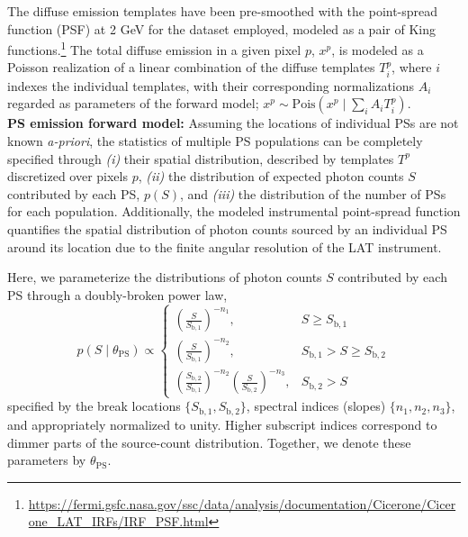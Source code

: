 \documentclass[prd,aps,10pt,nofootinbib,twocolumn,superscriptaddress,preprintnumbers,balancelastpage,longbibliography,floatfix]{revtex4-2}
\begin{document}
The diffuse emission templates have been pre-smoothed with the \Fermi point-spread function (PSF) at 2 GeV for the dataset employed, modeled as a pair of King functions.\footnote{\url{https://fermi.gsfc.nasa.gov/ssc/data/analysis/documentation/Cicerone/Cicerone_LAT_IRFs/IRF_PSF.html}} The total diffuse emission in a given pixel $p$, $x^p$, is modeled as a Poisson realization of a linear combination of the diffuse templates $T^p_i$, where $i$ indexes the individual templates, with their corresponding normalizations $A_i$ regarded as parameters of the forward model; $x^p \sim \mathrm{Pois}\left(x^p\mid\sum_i A_i T^p_i\right)$. \\ 

\noindent
\textbf{PS emission forward model:} Assuming the locations of individual PSs are not known \emph{a-priori}, the statistics of multiple PS populations can be completely specified through \emph{(i)} their spatial distribution, described by templates $T^p$ discretized over pixels $p$, \emph{(ii)} the distribution of expected photon counts $S$ contributed by each PS, $p(S)$, and \emph{(iii)} the distribution of the number of PSs for each population.  Additionally, the modeled instrumental point-spread function quantifies the spatial distribution of photon counts sourced by an individual PS around its location due to the finite angular resolution of the LAT instrument.

Here, we parameterize the distributions of photon counts $S$ contributed by each PS through a doubly-broken power law,
\begin{equation}
\label{eq:scd_bpl}
p(S\mid\theta_\mathrm{PS})\propto \left\{\begin{array}{lc}
\left(\frac{S}{S_{\mathrm b, 1}}\right)^{-n_{1}}, & S \geq S_{\mathrm b, 1} \\
\left(\frac{S}{S_{\mathrm b, 1}}\right)^{-n_{2}}, & S_{\mathrm b, 1}>S \geq S_{\mathrm b, 2} \\
\left(\frac{S_{\mathrm b, 2}}{S_{\mathrm b, 1}}\right)^{-n_{2}}\left(\frac{S}{S_{\mathrm b, 2}}\right)^{-n_{3}}, & S_{\mathrm b, 2}>S
\end{array}\right.
\end{equation}
specified by the break locations $\{S_{\mathrm b, 1}, S_{\mathrm b, 2}\}$, spectral indices (slopes) $\{n_1, n_2, n_3\}$, and appropriately normalized to unity. Higher subscript indices correspond to dimmer parts of the source-count distribution. Together, we denote these parameters by $\theta_\mathrm{PS}$.
\end{document}
